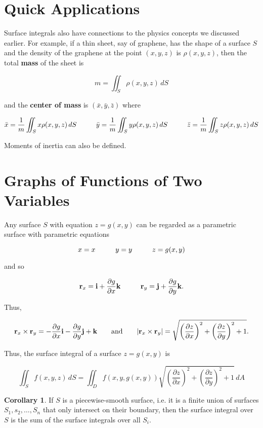 \documentclass[11pt,oneside,english]{amsart}
\theoremstyle{definition}
\newtheorem{corollary}{Corollary}
\newcommand{\aspace}{\hspace{7mm}\text{and}\hspace{7mm}}
\newcommand{\pspace}{\hspace{10mm}}
\newcommand{\pp}[2]{\frac{\partial{#1}}{\partial{#2}}}
\begin{document}
\section*{Quick Applications}

Surface integrals also have connections to the physics concepts we discussed earlier. For example, if a thin sheet, say of graphene, has the shape of a surface $S$ and the density of the graphene at the point $(x,y,z)$ is $\rho(x,y,z)$, then the total \textbf{mass} of the sheet is

\[
m=\iint_S\rho(x,y,z)\,dS
\]

and the \textbf{center of mass} is $(\bar{x},\bar{y},\bar{z})$ where

\[
\bar{x}=\frac{1}{m}\iint_Sx\rho(x,y,z)\,dS\pspace\bar{y}=\frac{1}{m}\iint_Sy\rho(x,y,z)\,dS\pspace\bar{z}=\frac{1}{m}\iint_Sz\rho(x,y,z)\,dS
\]

Moments of inertia can also be defined.

\pagebreak

\section*{Graphs of Functions of Two Variables}

Any surface $S$ with equation $z=g(x,y)$ can be regarded as a parametric surface with parametric equations

\[
x=x\pspace y=y\pspace z=g(x,y)
\]

and so

\[
\mathbf{r}_x=\mathbf{i}+\pp{g}{x}\mathbf{k}\pspace \mathbf{r}_y=\mathbf{j}+\pp{g}{y}\mathbf{k}.
\]

Thus,

\[
\mathbf{r}_x\times\mathbf{r}_y=-\pp{g}{x}\mathbf{i}-\pp{g}{y}\mathbf{j}+\mathbf{k}\aspace |\mathbf{r}_x\times\mathbf{r}_y|=\sqrt{\left(\pp{z}{x}\right)^2+\left(\pp{z}{y}\right)^2+1}.
\]

Thus, the surface integral of a surface $z=g(x,y)$ is

\[\boxed{
\iint_Sf(x,y,z)\,dS=\iint_Df(x,y,g(x,y))\sqrt{\left(\pp{z}{x}\right)^2+\left(\pp{z}{y}\right)^2+1}\,dA
}\]

\begin{corollary}
If $S$ is a piecewise-smooth surface, i.e. it is a finite union of surfaces $S_1,s_2,\ldots,S_n$ that only intersect on their boundary, then the surface integral over $S$ is the sum of the surface integrals over all $S_i$.
\end{corollary}
\end{document}
